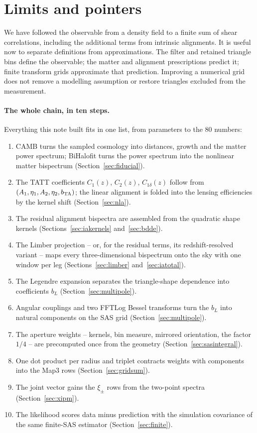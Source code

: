 \documentclass[11pt]{article}
\numberwithin{equation}{section}
\begin{document}
\section{Limits and pointers}
\label{sec:limits}

We have followed the observable from a density field to a finite sum of
shear correlations, including the additional terms from intrinsic
alignments. It is useful now to separate definitions from approximations.
The filter and retained triangle bins define the observable; the matter
and alignment prescriptions predict it; finite transform grids approximate
that prediction. Improving a numerical grid does not remove a modelling
assumption or restore triangles excluded from the measurement.

\paragraph{The whole chain, in ten steps.}
Everything this note built fits in one list, from parameters to the
$80$ numbers:
\begin{enumerate}
  \item CAMB turns the sampled cosmology into distances, growth and
    the matter power spectrum; BiHalofit turns the power spectrum
    into the nonlinear matter bispectrum
    (Section~\ref{sec:fiducial}).
  \item The TATT coefficients $C_1(z)$, $C_2(z)$,
    $C_{1\delta}(z)$ follow from $(A_1, \eta_1, A_2, \eta_2,
    b_{\rm TA})$; the linear alignment is folded into the lensing
    efficiencies by the kernel shift (Section~\ref{sec:nla}).
  \item The residual alignment bispectra are assembled from the
    quadratic shape kernels (Sections~\ref{sec:iakernels}
    and~\ref{sec:bdde}).
  \item The Limber projection -- or, for the residual terms, its
    redshift-resolved variant -- maps every three-dimensional
    bispectrum onto the sky with one window per leg
    (Sections~\ref{sec:limber} and~\ref{sec:iatotal}).
  \item The Legendre expansion separates the triangle-shape
    dependence into coefficients $b_L$
    (Section~\ref{sec:multipole}).
  \item Angular couplings and two FFTLog Bessel transforms turn the
    $b_L$ into natural components on the SAS grid
    (Section~\ref{sec:multipole}).
  \item The aperture weights -- kernels, bin measure, mirrored
    orientation, the factor $1/4$ -- are precomputed once from the
    geometry (Section~\ref{sec:sasintegral}).
  \item One dot product per radius and triplet contracts weights
    with components into the Map3 rows
    (Section~\ref{sec:gridsum}).
  \item The joint vector gains the $\xi_\pm$ rows from the
    two-point spectra (Section~\ref{sec:xipm}).
  \item The likelihood scores data minus prediction with the
    simulation covariance of the same finite-SAS estimator
    (Section~\ref{sec:finite}).
\end{enumerate}
\end{document}
